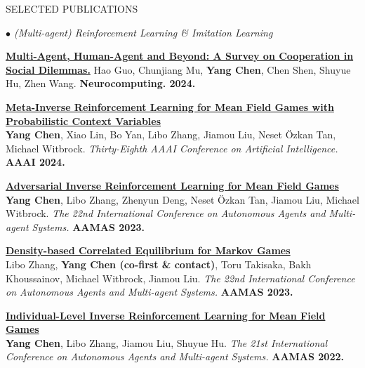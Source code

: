 \documentclass{resume} %
\begin{document}
\begin{rSection}{SELECTED PUBLICATIONS}

\begin{rSubsection}{\large\em $\bullet$ (Multi-agent) Reinforcement Learning \& Imitation Learning}{}{}{}
	\item {\href{https://authors.elsevier.com/c/1jnqd3INukSK0q}{\bf Multi-Agent, Human-Agent and Beyond: A Survey on Cooperation in Social Dilemmas.}} Hao Guo, Chunjiang Mu, \textbf{Yang Chen}, Chen Shen, Shuyue Hu, Zhen Wang. \textbf{Neurocomputing. 2024.}
	\item {\href{https://ojs.aaai.org/index.php/AAAI/article/view/29021}{\bf Meta-Inverse Reinforcement Learning for Mean Field Games with Probabilistic Context Variables}}\\
		\textbf{\bf Yang Chen}, Xiao Lin, Bo Yan, Libo Zhang, Jiamou Liu, Neset \"{O}zkan Tan, Michael Witbrock. {\em Thirty-Eighth AAAI Conference on Artificial Intelligence.} \textbf{AAAI 2024.}\\
	\item {\href{https://www.ifaamas.org/Proceedings/aamas2023/pdfs/p1088.pdf}{\bf Adversarial Inverse Reinforcement Learning for Mean Field Games}}\\
		\textbf{Yang Chen}, Libo Zhang, Zhenyun Deng, Neset \"{O}zkan Tan, Jiamou Liu, Michael Witbrock. {\em The 22nd International Conference on Autonomous Agents and Multi-agent Systems.} \textbf{AAMAS 2023.}\\
	\item {\href{https://www.ifaamas.org/Proceedings/aamas2023/pdfs/p652.pdf}{\bf Density-based Correlated Equilibrium for Markov Games}}\\
		Libo Zhang, \textbf{Yang Chen (co-first \& contact)}, Toru Takisaka, Bakh Khoussainov, Michael Witbrock, Jiamou Liu. {\em The 22nd International Conference on Autonomous Agents and Multi-agent Systems.} \textbf{AAMAS 2023.}\\
	\item {\href{https://ifaamas.org/Proceedings/aamas2022/pdfs/p253.pdf}{\bf Individual-Level Inverse Reinforcement Learning for Mean Field Games}}\\
		\textbf{Yang Chen}, Libo Zhang, Jiamou Liu, Shuyue Hu. {\em The 21st International Conference on Autonomous Agents and Multi-agent Systems.} \textbf{AAMAS 2022.}\\

\end{rSubsection}
\end{rSection}
\end{document}

